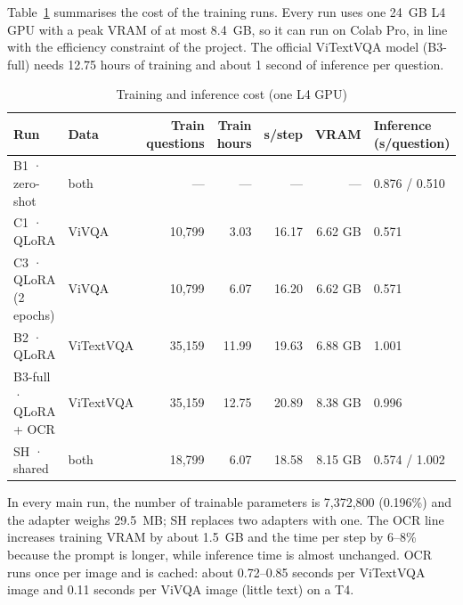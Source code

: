 Table~\ref{tab:res-cost} summarises the cost of the training runs. Every run uses one 24~GB
L4 GPU with a peak VRAM of at most 8.4~GB, so it can run on Colab Pro, in line with the
efficiency constraint of the project. The official ViTextVQA model (B3-full) needs 12.75
hours of training and about 1 second of inference per question.

\begin{table}[htbp]
\caption{Training and inference cost (one L4 GPU)}
\label{tab:res-cost}
\centering
\footnotesize
\begin{tabular}{p{}p{}rrrrp{}}
\toprule
\raggedright \textbf{Run} & \raggedright \textbf{Data} & \raggedright \textbf{Train questions} & \raggedright \textbf{Train hours} & \raggedright \textbf{s/step} & \raggedright \textbf{VRAM} & \raggedright \textbf{Inference (s/question)} \tabularnewline
\midrule
\raggedright B1 · zero-shot & \raggedright both & \raggedright --- & \raggedright --- & \raggedright --- & \raggedright --- & \raggedright 0.876 / 0.510 \tabularnewline
\raggedright C1 · QLoRA & \raggedright ViVQA & \raggedright 10,799 & \raggedright 3.03 & \raggedright 16.17 & \raggedright 6.62 GB & \raggedright 0.571 \tabularnewline
\raggedright C3 · QLoRA (2 epochs) & \raggedright ViVQA & \raggedright 10,799 & \raggedright 6.07 & \raggedright 16.20 & \raggedright 6.62 GB & \raggedright 0.571 \tabularnewline
\raggedright B2 · QLoRA & \raggedright ViTextVQA & \raggedright 35,159 & \raggedright 11.99 & \raggedright 19.63 & \raggedright 6.88 GB & \raggedright 1.001 \tabularnewline
\raggedright B3-full · QLoRA + OCR & \raggedright ViTextVQA & \raggedright 35,159 & \raggedright 12.75 & \raggedright 20.89 & \raggedright 8.38 GB & \raggedright 0.996 \tabularnewline
\raggedright SH · shared & \raggedright both & \raggedright 18,799 & \raggedright 6.07 & \raggedright 18.58 & \raggedright 8.15 GB & \raggedright 0.574 / 1.002 \tabularnewline
\bottomrule
\end{tabular}
\end{table}

In every main run, the number of trainable parameters is 7,372,800 (0.196\%) and the
adapter weighs 29.5~MB; SH replaces two adapters with one. The OCR line increases training
VRAM by about 1.5~GB and the time per step by 6--8\% because the prompt is longer, while
inference time is almost unchanged. OCR runs once per image and is cached: about 0.72--0.85
seconds per ViTextVQA image and 0.11 seconds per ViVQA image (little text) on a T4.

